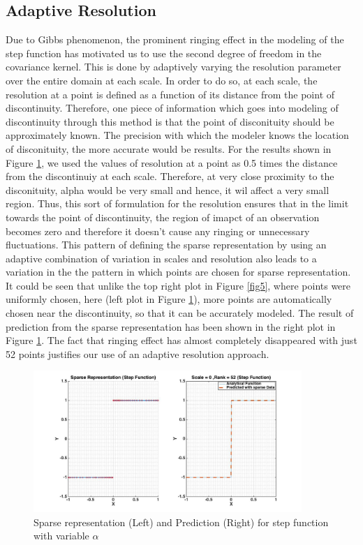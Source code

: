 \documentclass[procedia]{easychair}
\begin{document}
\subsection{Adaptive Resolution}

Due to Gibbs phenomenon, the prominent ringing effect in the modeling of the step function has motivated us to use the second degree of freedom in the covariance kernel. This is done by adaptively varying the resolution parameter over the entire domain at each scale. In order to do so, at each scale, the resolution at a point is defined as a function of its distance from the point of discontinuity. Therefore, one piece of information which goes into modeling of discontinuity through this method is that the point of disconituity should be approximately known. The precision with which the modeler knows the location of disconituity, the more accurate would be results. For the results shown in Figure \ref{fig6}, we used the values of resolution at a point as 0.5 times the distance from the discontinuiy at each scale. Therefore, at very close proximity to the disconituity, alpha would be very small and hence, it wil affect a very small region. Thus, this sort of formulation for the resolution ensures that in the limit towards the point of discontinuity, the region of imapct of an observation becomes zero and therefore it doesn't cause any ringing or unnecessary fluctuations. This pattern of defining the sparse representation by using an adaptive combination of variation in scales and resolution also leads to a variation in the the pattern in which points are chosen for sparse representation. It could be seen that unlike the top right plot in Figure \ref{fig5}, where points were uniformly chosen, here (left plot in Figure \ref{fig6}), more points are automatically chosen near the discontinuity, so that it can be accurately modeled. The result of prediction from the sparse representation has been shown in the right plot in Figure \ref{fig6}. The fact that ringing effect has almost completely disappeared with just 52 points justifies our use of an adaptive resolution approach. 



\begin{figure}[]  %
	\centering
	\includegraphics[width=4in]{alpha_var.jpg}
	\caption[Optional caption]{Sparse representation (Left) and Prediction (Right) for step function with variable $\alpha$}
	\label{fig6} %
\end{figure}
\end{document}
